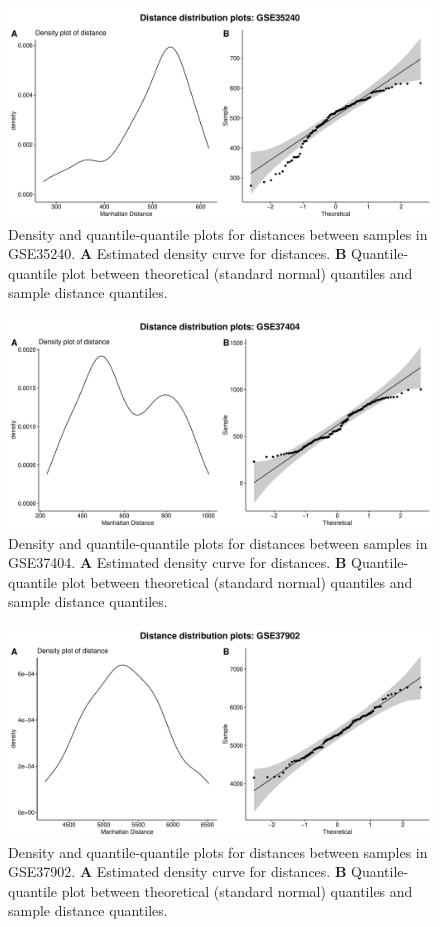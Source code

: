 \documentclass[10pt,letterpaper]{article}\usepackage[]{graphicx}\usepackage[]{color}
\begin{document}
\begin{figure}[H]
	\includegraphics[width=\textwidth]{manhattan-distance_hist_GSE35240.pdf}
	\caption{Density and quantile-quantile plots for distances between samples in GSE35240. \textbf{A} Estimated density curve for distances. \textbf{B} Quantile-quantile plot between theoretical (standard normal) quantiles and sample distance quantiles.}
\end{figure}

\begin{figure}[H]
	\includegraphics[width=\textwidth]{manhattan-distance_hist_GSE37404.pdf}
	\caption{Density and quantile-quantile plots for distances between samples in GSE37404. \textbf{A} Estimated density curve for distances. \textbf{B} Quantile-quantile plot between theoretical (standard normal) quantiles and sample distance quantiles.}
\end{figure}

\begin{figure}[H]
	\includegraphics[width=\textwidth]{manhattan-distance_hist_GSE37902.pdf}
	\caption{Density and quantile-quantile plots for distances between samples in GSE37902. \textbf{A} Estimated density curve for distances. \textbf{B} Quantile-quantile plot between theoretical (standard normal) quantiles and sample distance quantiles.}
\end{figure}
\end{document}
